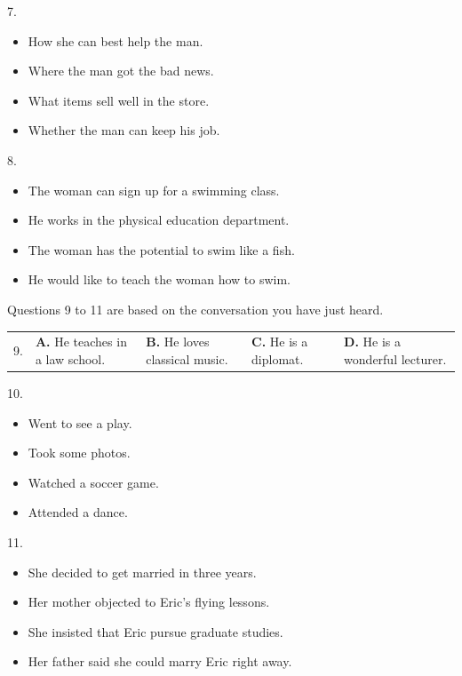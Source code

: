 \documentclass[UTF8,11pt]{ctexart}
\begin{document}
7.


\begin{itemize}[leftmargin=2em,itemsep=.2em,topsep=.4em]\item[A.] How she can best help the man.
\item[B.] Where the man got the bad news.
\item[C.] What items sell well in the store.
\item[D.] Whether the man can keep his job.
\end{itemize}

8.


\begin{itemize}[leftmargin=2em,itemsep=.2em,topsep=.4em]\item[A.] The woman can sign up for a swimming class.
\item[B.] He works in the physical education department.
\item[C.] The woman has the potential to swim like a fish.
\item[D.] He would like to teach the woman how to swim.
\end{itemize}

Questions 9 to 11 are based on the conversation you have just heard.


\noindent\begin{tabularx}{\linewidth}{@{}lXXXX@{}}9. & \textbf{A.} He teaches in a law school. & \textbf{B.} He loves classical music. & \textbf{C.} He is a diplomat. & \textbf{D.} He is a wonderful lecturer.\\\end{tabularx}\par

10.


\begin{itemize}[leftmargin=2em,itemsep=.2em,topsep=.4em]\item[A.] Went to see a play.
\item[C.] Took some photos.
\end{itemize}

\begin{itemize}[leftmargin=2em,itemsep=.2em,topsep=.4em]\item[B.] Watched a soccer game.
\item[D.] Attended a dance.
\end{itemize}

11.


\begin{itemize}[leftmargin=2em,itemsep=.2em,topsep=.4em]\item[A.] She decided to get married in three years.
\item[B.] Her mother objected to Eric’s flying lessons.
\item[C.] She insisted that Eric pursue graduate studies.
\item[D.] Her father said she could marry Eric right away.
\end{itemize}
\end{document}
